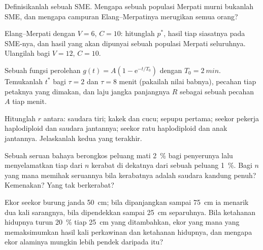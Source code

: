 \begin{exercise}[$\star$]\label{exo:b3:behavioural-ecology:4}
Definisikanlah sebuah SME. Mengapa sebuah populasi Merpati murni bukanlah SME, dan mengapa
campuran Elang--Merpatinya merugikan semua orang?
\end{exercise}

\begin{exercise}[$\star\star$]\label{exo:b3:behavioural-ecology:5}
Elang--Merpati dengan $V = 6$, $C = 10$: hitunglah $p^{*}$, hasil tiap
siasatnya pada SME-nya, dan hasil yang akan dipunyai sebuah populasi Merpati
seluruhnya. Ulangilah bagi $V = 12$, $C = 10$.
\end{exercise}

\begin{exercise}[$\star\star$]\label{exo:b3:behavioural-ecology:6}
Sebuah fungsi perolehan $g(t) = A(1 - \mathrm{e}^{-t/T_{0}})$ dengan $T_{0} =
\qty{2}{min}$. Temukanlah $t^{*}$ bagi $\tau = 2$ dan $\tau = 8$ menit (pakailah
nilai babnya), pecahan tiap petaknya yang dimakan, dan
laju jangka panjangnya $R$ sebagai sebuah pecahan $A$ tiap menit.
\end{exercise}

\begin{exercise}[$\star\star$]\label{exo:b3:behavioural-ecology:7}
Hitunglah $r$ antara: saudara tiri; kakek dan cucu; sepupu
pertama; seekor pekerja haplodiploid dan saudara jantannya; seekor ratu haplodiploid
dan anak jantannya. Jelaskanlah kedua yang terakhir.
\end{exercise}

\begin{exercise}[$\star\star$]\label{exo:b3:behavioural-ecology:8}
Sebuah seruan bahaya berongkos peluang mati \qty{2}{\%} bagi penyerunya lalu menyelamatkan
tiap dari $n$ kerabat di dekatnya dari sebuah peluang \qty{1}{\%}. Bagi $n$ yang mana
 memihak seruannya bila kerabatnya adalah saudara kandung penuh?
Kemenakan? Yang tak berkerabat?
\end{exercise}

\begin{exercise}[$\star\star$]\label{exo:b3:behavioural-ecology:9}
Ekor seekor burung janda \qty{50}{cm}; bila dipanjangkan sampai \qty{75}{cm} ia
menarik dua kali sarangnya, bila dipendekkan sampai \qty{25}{cm} separuhnya. Bila ketahanan hidupnya
turun \qty{20}{\%} tiap \qty{25}{cm} yang ditambahkan, ekor yang mana yang memaksimumkan
hasil kali perkawinan dan ketahanan hidupnya, dan mengapa ekor alaminya mungkin
lebih pendek daripada itu?
\end{exercise}

